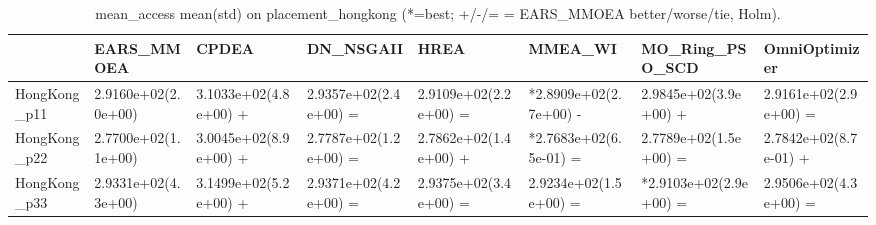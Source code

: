 \begin{table}[t]
\centering
\caption{mean_access mean(std) on placement_hongkong (*=best; +/-/= = EARS_MMOEA better/worse/tie, Holm).}
\label{tab:placement_hongkong_mean_access}
\begin{tabular}{llllllll}
\toprule
 & EARS\_MMOEA & CPDEA & DN\_NSGAII & HREA & MMEA\_WI & MO\_Ring\_PSO\_SCD & OmniOptimizer \\
\midrule
HongKong\_p11 & 2.9160e+02(2.0e+00) & 3.1033e+02(4.8e+00) + & 2.9357e+02(2.4e+00) = & 2.9109e+02(2.2e+00) = & *2.8909e+02(2.7e+00) - & 2.9845e+02(3.9e+00) + & 2.9161e+02(2.9e+00) = \\
HongKong\_p22 & 2.7700e+02(1.1e+00) & 3.0045e+02(8.9e+00) + & 2.7787e+02(1.2e+00) = & 2.7862e+02(1.4e+00) + & *2.7683e+02(6.5e-01) = & 2.7789e+02(1.5e+00) = & 2.7842e+02(8.7e-01) + \\
HongKong\_p33 & 2.9331e+02(4.3e+00) & 3.1499e+02(5.2e+00) + & 2.9371e+02(4.2e+00) = & 2.9375e+02(3.4e+00) = & 2.9234e+02(1.5e+00) = & *2.9103e+02(2.9e+00) = & 2.9506e+02(4.3e+00) = \\
\bottomrule
\end{tabular}
\end{table}
